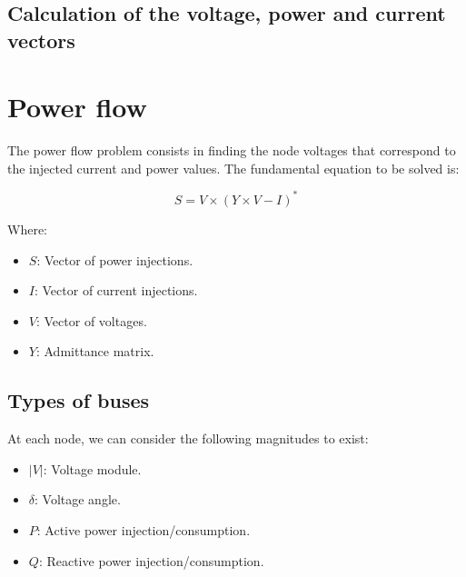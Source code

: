 \documentclass[a4paper,twoside,fleqn]{tufte-book}
\begin{document}
\section{Calculation of the voltage, power and current vectors}


\chapter{Power flow} \label{ch:power_flow}

The power flow problem consists in finding the node voltages that correspond to the injected current and power values. The fundamental equation to be solved is:

\begin{equation}
S = V \times (Y \times V - I)^*
\label{eq:power_flow}
\end{equation}


Where:

\begin{itemize}
\item $S$: Vector of power injections.
\item $I$: Vector of current injections.
\item $V$: Vector of voltages.
\item $Y$: Admittance matrix.
\end{itemize}


\section{Types of buses}

At each node, we can consider the following magnitudes to exist:
\begin{itemize}
	\item $|V|$: Voltage module.
	\item $\delta$: Voltage angle.
	\item $P$: Active power injection/consumption.
	\item $Q$: Reactive power injection/consumption.
\end{itemize}
\end{document}
